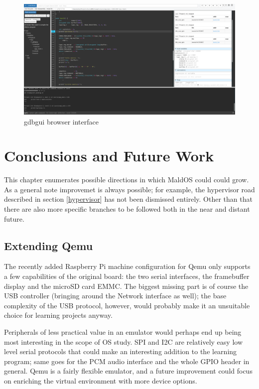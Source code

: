 \documentclass[12pt,a4paper,openright,twoside]{report}
\begin{document}
 \begin{figure}[t]
 \includegraphics[scale=0.34,angle=-90,origin=c]{images/tesi4.png}
 \caption[Gdbgui]{gdbgui browser interface}\label{fig:gdbgui}
 \end{figure}





\clearpage{\pagestyle{empty}\cleardoublepage}
\chapter{Conclusions and Future Work}
This chapter enumerates possible directions in which MaldOS could could grow. 
As a general note improvemet is always possible; for example, the hypervisor road
described in section \ref{hypervisor} has not been dismissed entirely. Other than
that there are also more specific branches to be followed both in the near and
distant future.

\section{Extending Qemu}
The recently added Raspberry Pi machine configuration for Qemu only supports a few
capabilities of the original board: the two serial interfaces, the framebuffer
display and the microSD card EMMC.
The biggest missing part is of course the USB controller (bringing around the
Network interface as well); the base complexity of the USB protocol, however,
 would probably make it an unsuitable choice for learning projects anyway.

Peripherals of less practical value in an emulator would perhaps end up being
most interesting in the scope of OS study. SPI and I2C are relatively
easy low level serial protocols that could make an interesting addition to the
learning program; same goes for the PCM audio interface and the whole GPIO 
header in general.
Qemu is a fairly flexible emulator, and a future improvement could focus on 
enriching the virtual environment with more device options.
\end{document}
